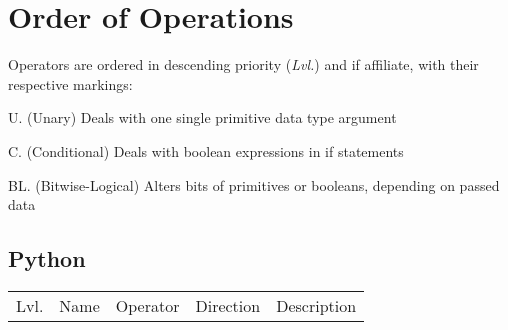 \documentclass{article}
\begin{document}
\setlength{\tabcolsep}{1pt}
\renewcommand{\arraystretch}{1}
\section{Order of Operations} 
Operators are ordered in descending priority (\textit{Lvl.}) and if affiliate, with their respective markings:

U. (Unary) \dotfill Deals with one single primitive data type argument

C. (Conditional) \dotfill Deals with boolean expressions in if statements

BL. (Bitwise-Logical) \dotfill Alters bits of primitives or booleans, depending on passed data

\subsection{Python}
\begin{center}\begin{tabularx}{\textwidth}{clccX}\toprule
  Lvl. & \quad Name & Operator & Direction & Description
\end{tabularx}\end{center}
\end{document}
